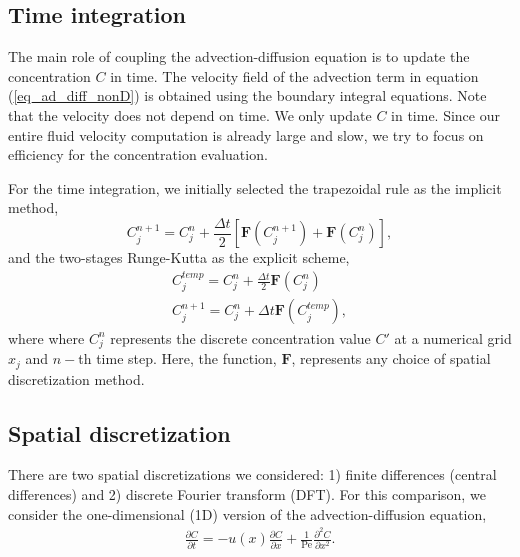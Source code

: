 \subsection{Time integration}
\label{sec:AD_times}
The main role of coupling the advection-diffusion equation is to update the concentration $C$ in time. The velocity field of the advection term in equation (\ref{eq_ad_diff_nonD}) is obtained using the boundary integral equations. Note that the velocity does not depend on time. 
We only update $C$ in time. Since our entire fluid velocity computation is already large and slow, we try to focus on efficiency for the concentration evaluation.
\par
For the time integration, 
we initially selected the trapezoidal rule as the implicit method,
\begin{equation}
	C_{j}^{n+1}
	 = C_{j}^{n}+ \frac{\Delta t}{2 } \left[  {\bm F} \left(C_j^{n+1} \right)+ {\bm F}\left(C_j^{n} \right) \right],
	 \label{eq_trap}
\end{equation}
and the two-stages Runge-Kutta as the explicit scheme,
\begin{align}
	C_{j}^{temp} = C_j^{n} + \frac{\Delta t}{2} {\bm F} \left( C_j^{n} \right)
	\label{eq_RK_step1} \\ 
	C_j^{n+1} = C_j^{n} + \Delta t {\bm F} \left( C_j^{temp} \right),
	\label{eq_RK_step2}
\end{align}
where where $C_j^n$  represents the discrete concentration value $C'$ at a numerical grid $x_j$ and $n-$th time step.
Here, the function, $\bm{F}$, represents any choice of spatial discretization method. 

\subsection{Spatial discretization}
\label{subsec:AD_numerics_space}
There are two spatial discretizations we considered: 1) finite differences (central differences) and 2) discrete Fourier transform (DFT). 
For this comparison, we consider the one-dimensional (1D) version of the advection-diffusion equation,
\begin{align}
	\frac{\partial C}{\partial t} = 
	- u(x) \frac{\partial C}{\partial x} 
	+ \frac{1}{\text{Pe}} \frac{\partial^2 C}{\partial x^2}.
	\label{eq_space_C}
\end{align}

